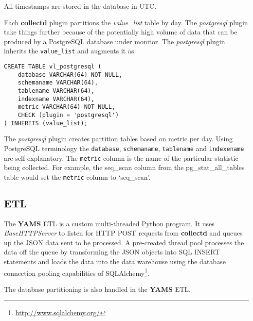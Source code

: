 \documentclass[a4paper,twoside,12pt]{article}
\begin{document}
All timestamps are stored in the database in UTC.

Each \textbf{collectd} plugin partitions the \textit{value\_list} table by day.
The \textit{postgresql} plugin take things further because of the potentially
high volume of data that can be produced by a PostgreSQL database under
monitor.  The \textit{postgresql} plugin inherits the \texttt{value\_list} and
augments it as:

\lstset{language=sql}
\begin{lstlisting}
CREATE TABLE vl_postgresql (
    database VARCHAR(64) NOT NULL,
    schemaname VARCHAR(64),
    tablename VARCHAR(64),
    indexname VARCHAR(64),
    metric VARCHAR(64) NOT NULL,
    CHECK (plugin = 'postgresql')
) INHERITS (value_list);
\end{lstlisting}

The \textit{postgresql} plugin creates partition tables based on metric per
day.  Using PostgreSQL terminology the \texttt{database}, \texttt{schemaname},
\texttt{tablename} and \texttt{indexename} are self-explanatory.  The
\texttt{metric} column is the name of the particular statistic being collected.
For example, the seq\_scan column from the pg\_stat\_all\_tables table would
set the \texttt{metric} column to `seq\_scan'.

\subsection{ETL}

The \textbf{YAMS} ETL is a custom multi-threaded Python program.  It uses
\textit{BaseHTTPServer} to listen for HTTP POST requests from
\textbf{collectd} and queues up the JSON data sent to be processed.  A
pre-created thread pool processes the data off the queue by transforming the
JSON objects into SQL INSERT statements and loads the data into the data
warehouse using the database connection pooling capabilities of
SQLAlchemy\footnote{\url{http://www.sqlalchemy.org/}}.

The database partitioning is also handled in the \textbf{YAMS} ETL.
\end{document}

